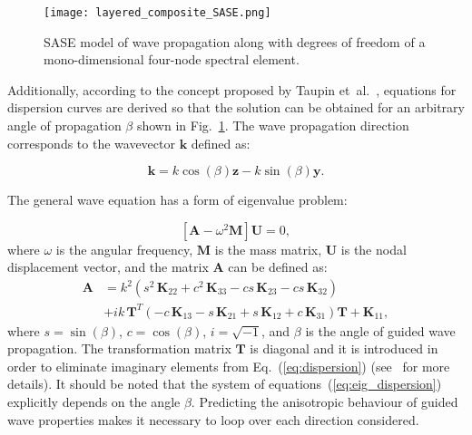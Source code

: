 \documentclass[preprint,12pt]{elsarticle}
\newcommand{\matr}[1]{\mathbf{#1}} %
\newcommand{\vect}[1]{\mathbf{#1}} %
\begin{document}
		\begin{figure} [h!]
		\centering
		\texttt{[image: layered\_composite\_SASE.png]}
		\caption{SASE model of wave propagation along with degrees of freedom of a mono-dimensional four-node spectral element.}
		\label{fig:layered_composite_SASE}
	\end{figure}
	
	Additionally, according to the concept proposed by Taupin et~al.~\cite{Taupin2011}, equations for dispersion curves are derived so that the solution can be obtained for an arbitrary angle of propagation $\beta$ shown in Fig.~\ref{fig:layered_composite_SASE}. The wave propagation direction corresponds to the wavevector $\vect{k}$ defined as:
	
	\begin{equation}
	  \vect{k} = k \cos (\beta) \vect{z} - k \sin (\beta) \vect{y}.
		\label{eq:wavevector}
	\end{equation}
	
   The general wave equation has a form of eigenvalue problem:

	\begin{equation}
	\left[\matr{A} - \omega^2\matr{M} \right] \vect{U} =0,
	\label{eq:eig_dispersion}
	\end{equation}
	where $\omega$ is the angular frequency, $\matr{M}$ is the mass matrix, $\matr{U}$ is the nodal displacement vector, and the matrix $\matr{A}$ can be defined as:
	\begin{equation}
	\begin{aligned}
	\matr{A} & =  k^2\left(s^2 \,\matr{K}_{22} + c^2\, \matr{K}_{33} - c s\, \matr{K}_{23} - c s\, \matr{K}_{32}\right) \\
	& + i k\, \matr{T}^T\left(-c\, \matr{K}_{13} - s\, \matr{K}_{21} + s\, \matr{K}_{12} + c\, \matr{K}_{31}\right) \matr{T} +\matr{K}_{11},
	\end{aligned}
	\label{eq:dispersion}
	\end{equation}
	where  $s = \sin(\beta)$, $c = \cos(\beta)$, $i = \sqrt{-1}$, and $\beta$ is the angle of guided wave propagation. The transformation matrix $\matr{T}$ is diagonal and it is introduced in order to eliminate imaginary elements from Eq.~(\ref{eq:dispersion}) (see~\cite{Bartoli2006} for more details). It should be noted that the system of equations~(\ref{eq:eig_dispersion}) explicitly depends on the angle $\beta$. Predicting the anisotropic behaviour of guided wave properties makes it necessary to loop over each direction considered.
	
\end{document}
